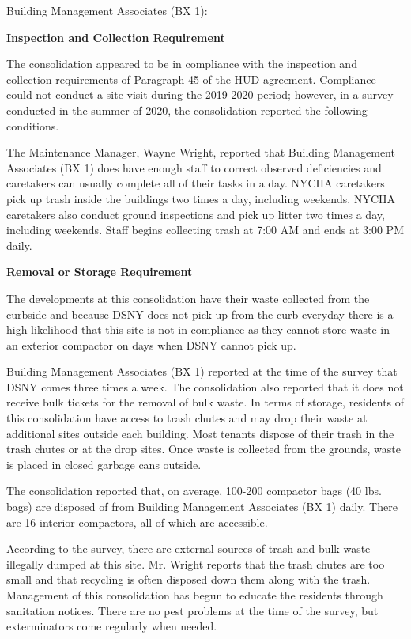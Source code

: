 Building Management Associates (BX 1):

\textbf{Inspection and Collection Requirement}

The consolidation appeared to be in compliance with the inspection and collection requirements of Paragraph 45 of the HUD agreement. Compliance could not conduct a site visit during the 2019-2020 period; however, in a survey conducted in the summer of 2020, the consolidation reported the following conditions.

The Maintenance Manager, Wayne Wright, reported that Building Management Associates (BX 1) does have enough staff to correct observed deficiencies and caretakers can usually complete all of their tasks in a day. NYCHA caretakers pick up trash inside the buildings two times a day, including weekends. NYCHA caretakers also conduct ground inspections and pick up litter two times a day, including weekends. Staff begins collecting trash at 7:00 AM and ends at 3:00 PM daily. 

\textbf{Removal or Storage Requirement}

The developments at this consolidation have their waste collected from the curbside and because DSNY does not pick up from the curb everyday there is a high likelihood that this site is not in compliance as they cannot store waste in an exterior compactor on days when DSNY cannot pick up.

Building Management Associates (BX 1) reported at the time of the survey that DSNY comes three times a week. The consolidation also reported that it does not receive bulk tickets for the removal of bulk waste. In terms of storage, residents of this consolidation have access to trash chutes and may drop their waste at additional sites outside each building. Most tenants dispose of their trash in the trash chutes or at the drop sites. Once waste is collected from the grounds, waste is placed in closed garbage cans outside. 

The consolidation reported that, on average, 100-200 compactor bags (40 lbs. bags) are disposed of from Building Management Associates (BX 1) daily. There are 16 interior compactors, all of which are accessible. 

According to the survey, there are external sources of trash and bulk waste illegally dumped at this site. Mr. Wright reports that the trash chutes are too small and that recycling is often disposed down them along with the trash. Management of this consolidation has begun to educate the residents through sanitation notices. There are no pest problems at the time of the survey, but exterminators come regularly when needed.